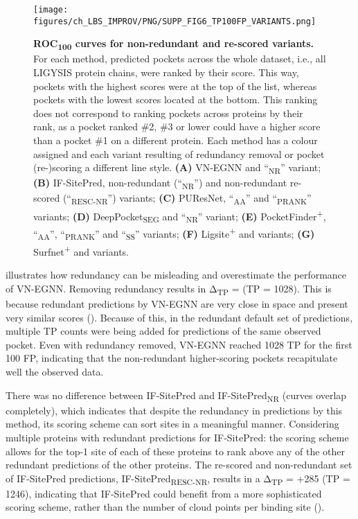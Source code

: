 \begin{figure}[htbp!]
    \centering
    \texttt{[image: figures/ch\_LBS\_IMPROV/PNG/SUPP\_FIG6\_TP100FP\_VARIANTS.png]}
    \caption[ROC\textsubscript{100} curves for non-redundant and re-scored variants]{\textbf{ROC\textsubscript{100} curves for non-redundant and re-scored variants.} For each method, predicted pockets across the whole dataset, i.e., all LIGYSIS protein chains, were ranked by their score. This way, pockets with the highest scores were at the top of the list, whereas pockets with the lowest scores located at the bottom. This ranking does not correspond to ranking pockets across proteins by their rank, as a pocket ranked \#2, \#3 or lower could have a higher score than a pocket \#1 on a different protein. Each method has a colour assigned and each variant resulting of redundancy removal or pocket (re-)scoring a different line style. \textbf{(A)} VN-EGNN and ``\textsubscript{NR}'' variant; \textbf{(B)} IF-SitePred, non-redundant (``\textsubscript{NR}'') and non-redundant re-scored (``\textsubscript{RESC-NR}'') variants; \textbf{(C)} PUResNet, ``\textsubscript{AA}'' and ``\textsubscript{PRANK}'' variants; \textbf{(D)} DeepPocket\textsubscript{SEG} and ``\textsubscript{NR}'' variant; \textbf{(E)} PocketFinder\textsuperscript{+}, ``\textsubscript{AA}'', ``\textsubscript{PRANK}'' and ``\textsubscript{SS}'' variants; \textbf{(F)} Ligsite\textsuperscript{+} and variants; \textbf{(G)} Surfnet\textsuperscript{+} and variants.}
    \label{fig:pocket_ROC100_variants}
\end{figure}


 illustrates how redundancy can be misleading and overestimate the performance of VN-EGNN. Removing redundancy results in Δ\textsubscript{TP} =  (TP = 1028). This is because redundant predictions by VN-EGNN are very close in space and present very similar scores (). Because of this, in the redundant default set of predictions, multiple TP counts were being added for predictions of the same observed pocket. Even with redundancy removed, VN-EGNN reached 1028 TP for the first 100 FP, indicating that the non-redundant higher-scoring pockets recapitulate well the observed data.

There was no difference between IF-SitePred and IF-SitePred\textsubscript{NR} (curves overlap completely), which indicates that despite the redundancy in predictions by this method, its scoring scheme can sort sites in a meaningful manner. Considering multiple proteins with redundant predictions for IF-SitePred: the scoring scheme allows for the top-1 site of each of these proteins to rank above any of the other redundant predictions of the other proteins. The re-scored and non-redundant set of IF-SitePred predictions, IF-SitePred\textsubscript{RESC-NR}, results in a Δ\textsubscript{TP} = +285 (TP = 1246), indicating that IF-SitePred could benefit from a more sophisticated scoring scheme, rather than the number of cloud points per binding site ().

